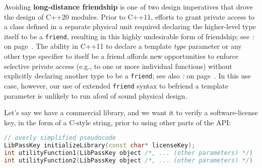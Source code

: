Avoiding \textbf{long-distance friendship} is one of two design
imperatives that drove the design of C++20 modules. Prior to C++11,
efforts to grant private access to a class defined in a separate
physical unit required declaring the higher-level type itself to be a
\texttt{friend}, resulting in this highly undesirable form of
friendship; see \textit{: } on page~\pageref{long-distance-friendship}. The ability in C++11 to
declare a template \emph{type} parameter or any other type specifier to
itself be a friend affords new opportunities to enforce selective
private access (e.g., to one or more individual functions) without
explicitly declaring another type to be a \texttt{friend}; see also \textit{: } on page~\pageref{granting-a-specific-type-access-to-a-single-private-function}. In this use case, however, our use of extended
\texttt{friend} syntax to befriend a template parameter is unlikely to run
afoul of sound physical design.

Let's say we have a commercial library, and we want it to verify a
software-license key, in the form of a C-style string, prior to using
other parts of the API:

\begin{lstlisting}[language=C++]
// overly simplified pseudocode
LibPassKey initializeLibrary(const char* licenseKey);
int utilityFunction1(LibPassKey object /*, ... (other parameters) */)
int utilityFunction2(LibPassKey object /*, ... (other parameters) */)
\end{lstlisting}


